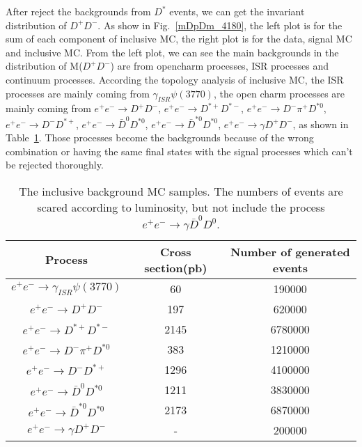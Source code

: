 \documentclass[aps,preprint,tightenlines,superscriptaddress,showpacs,byrevtex,amsmath,amssymb,nofloatfix]{revtex4}
\begin{document}
After reject the backgrounds from $D^{*}$ events, we can get the invariant distribution of $D^{+}D^{-}$. As show in Fig.~\ref{mDpDm_4180}, the left plot is for the sum of each component of inclusive MC, the right plot is for the data, signal MC and inclusive MC.  From the left plot, we can see the main backgrounds in the distribution of M($D^{+}D^{-}$) are from opencharm processes, ISR processes and continuum processes. According the topology analysis of inclusive MC, the ISR processes are mainly coming from $\gamma_{ISR} \psi(3770)$, the open charm processes are mainly coming from $e^{+}e^{-}\rightarrow D^{+}D^{-}$, $e^{+}e^{-}\rightarrow D^{*+}D^{*-}$, $e^{+}e^{-}\rightarrow D^{-}\pi^{+}D^{*0}$, $e^{+}e^{-}\rightarrow D^{-}D^{*+}$, $e^{+}e^{-}\rightarrow \bar{D}^{0}D^{*0}$, $e^{+}e^{-}\rightarrow \bar{D}^{*0}D^{*0}$, $e^{+}e^{-}\rightarrow \gamma D^{+}D^{-}$, as shown in Table~\ref{background_table_Dp}. Those processes become the backgrounds because of the wrong  combination or having the same final states with the signal processes which can't be rejected thoroughly.

\begin{table}[!htbp]
\caption{The inclusive background MC samples. The numbers of events are scared according to luminosity, but not include the process $e^{+}e^{-}\rightarrow \gamma \bar{D}^{0}D^{0}$.}
\label{background_table_Dp}
\begin{tabular}{|c|c|c|}
  \hline
  Process  &   Cross section(pb)  & Number of generated events  \\
  \hline
  $e^{+}e^{-}\rightarrow \gamma_{ISR} \psi(3770)$ & 60 & 190000  \\
  $e^{+}e^{-}\rightarrow D^{+}D^{-}$              & 197  & 620000  \\
  $e^{+}e^{-}\rightarrow D^{*+}D^{*-}$            & 2145   &6780000  \\
  $e^{+}e^{-}\rightarrow D^{-}\pi^{+}D^{*0}$      & 383  &1210000      \\
  $e^{+}e^{-}\rightarrow D^{-}D^{*+}$             &  1296  &4100000     \\
  $e^{+}e^{-}\rightarrow \bar{D}^{0}D^{*0}$        &   1211  &3830000  \\
  $e^{+}e^{-}\rightarrow \bar{D}^{*0}D^{*0}$      &  2173  &6870000       \\
  $e^{+}e^{-}\rightarrow \gamma D^{+}D^{-}$              &  -    &  200000 \\
  \hline
\end{tabular}
\end{table}
\end{document}
